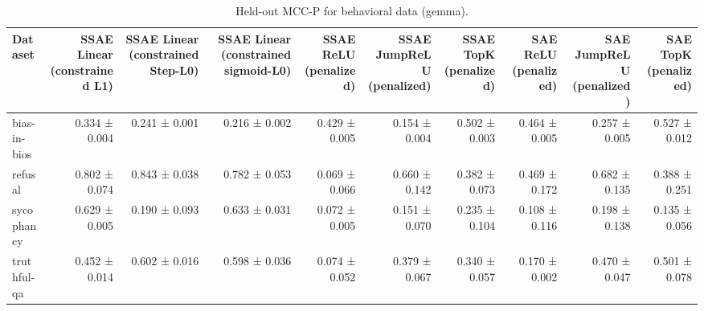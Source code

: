 \begin{table}[t]
\centering
\caption{Held-out MCC-P for behavioral data (gemma).}
\label{tab:behavioral-gemma-mcc-p}
\begin{tabular}{lrrrrrrrrr}
\toprule
Dataset & SSAE Linear (constrained L1) & SSAE Linear (constrained Step-L0) & SSAE Linear (constrained sigmoid-L0) & SSAE ReLU (penalized) & SSAE JumpReLU (penalized) & SSAE TopK (penalized) & SAE ReLU (penalized) & SAE JumpReLU (penalized) & SAE TopK (penalized) \\
\midrule
bias-in-bios & 0.334 ± 0.004 & 0.241 ± 0.001 & 0.216 ± 0.002 & 0.429 ± 0.005 & 0.154 ± 0.004 & 0.502 ± 0.003 & 0.464 ± 0.005 & 0.257 ± 0.005 & 0.527 ± 0.012 \\
refusal & 0.802 ± 0.074 & 0.843 ± 0.038 & 0.782 ± 0.053 & 0.069 ± 0.066 & 0.660 ± 0.142 & 0.382 ± 0.073 & 0.469 ± 0.172 & 0.682 ± 0.135 & 0.388 ± 0.251 \\
sycophancy & 0.629 ± 0.005 & 0.190 ± 0.093 & 0.633 ± 0.031 & 0.072 ± 0.005 & 0.151 ± 0.070 & 0.235 ± 0.104 & 0.108 ± 0.116 & 0.198 ± 0.138 & 0.135 ± 0.056 \\
truthful-qa & 0.452 ± 0.014 & 0.602 ± 0.016 & 0.598 ± 0.036 & 0.074 ± 0.052 & 0.379 ± 0.067 & 0.340 ± 0.057 & 0.170 ± 0.002 & 0.470 ± 0.047 & 0.501 ± 0.078 \\
\bottomrule
\end{tabular}
\end{table}
